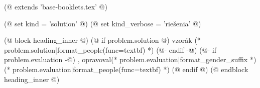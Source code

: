 (@ extends 'base-booklets.tex' @)

(@ set kind = 'solution' @)
(@ set kind_verbose = 'riešenia' @)

(@ block heading_inner @)
    (@ if problem.solution @)%
        vzorák (* problem.solution|format_people(func=textbf) *)%
    (@- endif -@)%
    (@- if problem.evaluation -@)%
        , opravoval(* problem.evaluation|format_gender_suffix *) (* problem.evaluation|format_people(func=textbf) *)%
    (@ endif @)%
(@ endblock heading_inner @)
